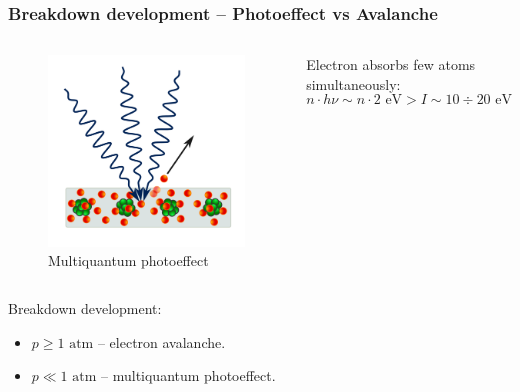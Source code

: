 \documentclass{beamer}
\begin{document}
	\begin{frame}
		\frametitle{Breakdown development -- Photoeffect vs Avalanche}
		
		\begin{columns}
			\begin{figure}
				\centering
				\includegraphics[width=0.9\linewidth]{res/multiphoton.png}
				\caption*{Multiquantum photoeffect}
			\end{figure}
			
			Electron absorbs few atoms simultaneously: 
			$$n \cdot h\nu \sim n \cdot 2 \text{ eV} > I \sim 10 \div 20 \text{ eV}$$
		\end{columns}
		
		Breakdown development:
		\begin{itemize}
			\item $p \geqslant 1\text{ atm}$ -- electron avalanche.
			\item $p \ll 1\text{ atm}$ -- multiquantum photoeffect.
		\end{itemize}
	\end{frame}
	
\end{document}
